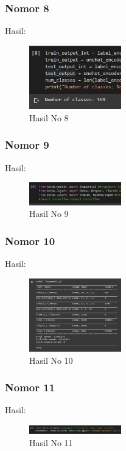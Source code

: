 \subsubsection{Nomor 8}
\hfill\break

Hasil:
\begin{figure}[H]
\centering
	\includegraphics[width=4cm]{figures/1174067/7/no8.jpg}
	\caption{Hasil No 8}
\end{figure}

\subsubsection{Nomor 9}
\hfill\break

Hasil:
\begin{figure}[H]
\centering
	\includegraphics[width=4cm]{figures/1174067/7/no9.jpg}
	\caption{Hasil No 9}
\end{figure}

\subsubsection{Nomor 10}
\hfill\break

Hasil:
\begin{figure}[H]
\centering
	\includegraphics[width=4cm]{figures/1174067/7/no10.jpg}
	\caption{Hasil No 10}
\end{figure}

\subsubsection{Nomor 11}
\hfill\break

Hasil:
\begin{figure}[H]
\centering
	\includegraphics[width=4cm]{figures/1174067/7/no11.jpg}
	\caption{Hasil No 11}
\end{figure}

